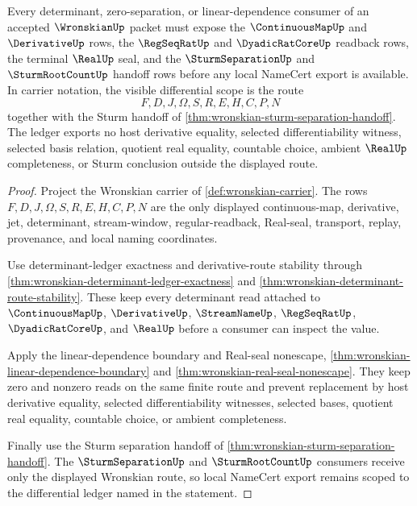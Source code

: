 \begin{theorem}
\label{thm:wronskian-differential-scope-ledger}
Every determinant, zero-separation, or linear-dependence consumer of an accepted $\WronskianUp$ packet must expose the $\ContinuousMapUp$ and $\DerivativeUp$ rows, the $\RegSeqRatUp$ and $\DyadicRatCoreUp$ readback rows, the terminal $\RealUp$ seal, and the $\SturmSeparationUp$ and $\SturmRootCountUp$ handoff rows before any local NameCert export is available. In carrier notation, the visible differential scope is the route
$$
F,D,J,\Omega,S,R,E,H,C,P,N
$$
together with the Sturm handoff of \autoref{thm:wronskian-sturm-separation-handoff}. The ledger exports no host derivative equality, selected differentiability witness, selected basis relation, quotient real equality, countable choice, ambient $\RealUp$ completeness, or Sturm conclusion outside the displayed route.
\end{theorem}
\begin{proof}
Project the Wronskian carrier of \autoref{def:wronskian-carrier}. The rows $F,D,J,\Omega,S,R,E,H,C,P,N$ are the only displayed continuous-map, derivative, jet, determinant, stream-window, regular-readback, Real-seal, transport, replay, provenance, and local naming coordinates.

Use determinant-ledger exactness and derivative-route stability through \autoref{thm:wronskian-determinant-ledger-exactness} and \autoref{thm:wronskian-determinant-route-stability}. These keep every determinant read attached to $\ContinuousMapUp$, $\DerivativeUp$, $\StreamNameUp$, $\RegSeqRatUp$, $\DyadicRatCoreUp$, and $\RealUp$ before a consumer can inspect the value.

Apply the linear-dependence boundary and Real-seal nonescape, \autoref{thm:wronskian-linear-dependence-boundary} and \autoref{thm:wronskian-real-seal-nonescape}. They keep zero and nonzero reads on the same finite route and prevent replacement by host derivative equality, selected differentiability witnesses, selected bases, quotient real equality, countable choice, or ambient completeness.

Finally use the Sturm separation handoff of \autoref{thm:wronskian-sturm-separation-handoff}. The $\SturmSeparationUp$ and $\SturmRootCountUp$ consumers receive only the displayed Wronskian route, so local NameCert export remains scoped to the differential ledger named in the statement.
\end{proof}

